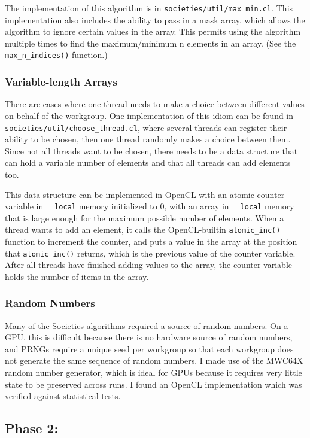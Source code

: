 \documentclass{article}
\begin{document}
The implementation of this algorithm is in \texttt{societies/util/max\_min.cl}. This implementation also includes the ability to pass in a mask array, which allows the algorithm to ignore certain values in the array. This permits using the algorithm multiple times to find the maximum/minimum n elements in an array. (See the \texttt{max\_n\_indices()} function.)

\subsubsection{Variable-length Arrays}
There are cases where one thread needs to make a choice between different values on behalf of the workgroup. One implementation of this idiom can be found in \texttt{societies/util/choose\_thread.cl}, where several threads can register their ability to be chosen, then one thread randomly makes a choice between them. Since not all threads want to be chosen, there needs to be a data structure that can hold a variable number of elements and that all threads can add elements too.

This data structure can be implemented in OpenCL with an atomic counter variable in \texttt{\_\_local} memory initialized to 0, with an array in \texttt{\_\_local} memory that is large enough for the maximum possible number of elements. When a thread wants to add an element, it calls the OpenCL-builtin \texttt{atomic\_inc()} function to increment the counter, and puts a value in the array at the position that \texttt{atomic\_inc()} returns, which is the previous value of the counter variable. After all threads have finished adding values to the array, the counter variable holds the number of items in the array.

\subsubsection{Random Numbers}
Many of the Societies algorithms required a source of random numbers. On a GPU, this is difficult because there is no hardware source of random numbers, and PRNGs require a unique seed per workgroup so that each workgroup does not generate the same sequence of random numbers. I made use of the MWC64X random number generator, which is ideal for GPUs because it requires very little state to be preserved across runs. I found an OpenCL implementation which was verified against statistical tests.\cite{mwc64x}

\subsection{Phase 2: }
\end{document}
